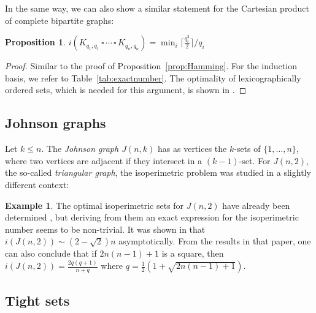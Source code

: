 \documentclass[a4paper,11pt]{article}
\newtheorem{proposition}[theorem]{Proposition}
\theoremstyle{definition}
\newtheorem{example}[theorem]{Example}
\newcommand{\cartesianproduct}{\,\square\,}
\begin{document}
In the same way, we can also show a similar statement for the Cartesian product of complete bipartite graphs:
\begin{proposition}
    \(i(K_{q_1,q_1}\cartesianproduct\cdots\cartesianproduct K_{q_n,q_n})=\min_i\lceil\frac{q_i^2}2\rceil/q_i\)
\end{proposition}
\begin{proof}
    Similar to the proof of Proposition~\ref{prop:Hamming}. For the induction basis, we refer to Table~\ref{tab:exactnumber}. The optimality of lexicographically ordered sets, which is needed for this argument, is shown in \cite{AhlswedeCai}.\end{proof}

\subsection{Johnson graphs}
Let \(k\leq n\). The \emph{Johnson graph $J(n,k)$} has as vertices the \(k\)-sets of $\{1,\dots,n\}$, where two vertices are adjacent if they intersect in a \((k-1)\)-set. For \(J(n,2)\), the so-called \emph{triangular graph}, the isoperimetric problem was studied in a slightly different context:

\begin{example}
    The optimal isoperimetric sets for \(J(n,2)\) have already been determined \cite{Ahl78}, but deriving from them an exact expression for the isoperimetric number seems to be non-trivial. It was shown in \cite{triangular} that \(i(J(n,2))\sim (2-\sqrt{2})n\) asymptotically. From the results in that paper, one can also conclude that if \(2n(n-1)+1\) is a square, then \(i(J(n,2))=\frac{2q(q+1)}{n+q}\) where \(q=\frac12(1+\sqrt{2n(n-1)+1})\).
\end{example}

\subsection{Tight sets}
\end{document}
